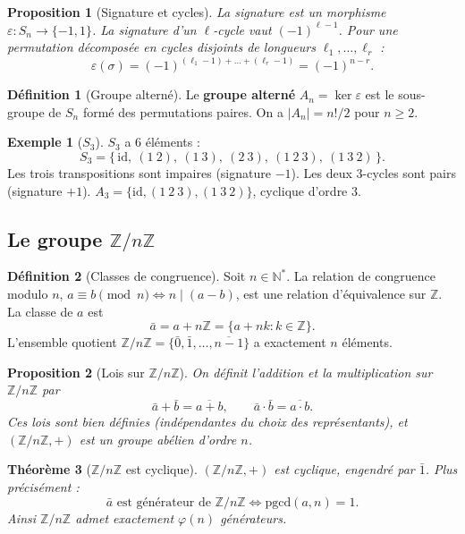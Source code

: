 \documentclass[12pt,a4paper]{report}
\newtheorem{theoreme}{Théorème}[section]
\newtheorem{proposition}[theoreme]{Proposition}
\theoremstyle{definition}
\newtheorem{definition}{Définition}[section]
\newtheorem{exemple}{Exemple}[section]
\theoremstyle{remark}
\begin{document}
\begin{proposition}[Signature et cycles]
La signature est un morphisme $\varepsilon : S_n \to \{-1, 1\}$. La signature d'un $\ell$-cycle vaut $(-1)^{\ell-1}$. Pour une permutation décomposée en cycles disjoints de longueurs $\ell_1, \dots, \ell_r$ :
\[ \varepsilon(\sigma) = (-1)^{(\ell_1 - 1) + \dots + (\ell_r - 1)} = (-1)^{n - r}. \]
\end{proposition}

\begin{definition}[Groupe alterné]
Le \textbf{groupe alterné} $A_n = \ker \varepsilon$ est le sous-groupe de $S_n$ formé des permutations paires. On a $|A_n| = n!/2$ pour $n \ge 2$.
\end{definition}

\begin{exemple}[$S_3$]
$S_3$ a $6$ éléments :
\[ S_3 = \{\,\mathrm{id},\ (1\ 2),\ (1\ 3),\ (2\ 3),\ (1\ 2\ 3),\ (1\ 3\ 2)\,\}. \]
Les trois transpositions sont impaires (signature $-1$). Les deux $3$-cycles sont pairs (signature $+1$). $A_3 = \{\mathrm{id}, (1\ 2\ 3), (1\ 3\ 2)\}$, cyclique d'ordre $3$.
\end{exemple}

\subsection{Le groupe $\mathbb{Z}/n\mathbb{Z}$}

\begin{definition}[Classes de congruence]
Soit $n \in \mathbb{N}^*$. La relation de congruence modulo $n$, $a \equiv b \pmod{n} \iff n \mid (a - b)$, est une relation d'équivalence sur $\mathbb{Z}$. La classe de $a$ est
\[ \bar{a} = a + n\mathbb{Z} = \{a + nk : k \in \mathbb{Z}\}. \]
L'ensemble quotient $\mathbb{Z}/n\mathbb{Z} = \{\bar{0}, \bar{1}, \dots, \overline{n-1}\}$ a exactement $n$ éléments.
\end{definition}

\begin{proposition}[Lois sur $\mathbb{Z}/n\mathbb{Z}$]
On définit l'addition et la multiplication sur $\mathbb{Z}/n\mathbb{Z}$ par
\[ \bar{a} + \bar{b} = \overline{a + b}, \qquad \bar{a} \cdot \bar{b} = \overline{a \cdot b}. \]
Ces lois sont bien définies (indépendantes du choix des représentants), et $(\mathbb{Z}/n\mathbb{Z}, +)$ est un groupe abélien d'ordre $n$.
\end{proposition}

\begin{theoreme}[$\mathbb{Z}/n\mathbb{Z}$ est cyclique]
$(\mathbb{Z}/n\mathbb{Z}, +)$ est cyclique, engendré par $\bar{1}$. Plus précisément :
\[ \bar{a} \text{ est générateur de } \mathbb{Z}/n\mathbb{Z} \iff \mathrm{pgcd}(a, n) = 1. \]
Ainsi $\mathbb{Z}/n\mathbb{Z}$ admet exactement $\varphi(n)$ générateurs.
\end{theoreme}
\end{document}
